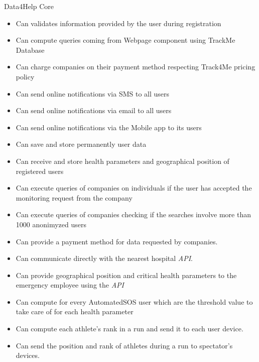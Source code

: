 \noindent Data4Help Core
\begin{itemize}
\item Can validates information provided by the user during registration
\item Can compute queries coming from Webpage component using TrackMe Database
\item Can charge companies on their payment method respecting Track4Me pricing policy

\item Can send online notifications via SMS to all users 
\item Can send online notifications via email to all users
\item Can send online notifications via the Mobile app to its users
\item Can save and store permanently user data
\item Can receive and store health parameters and geographical position of registered users
\item Can execute queries of companies on individuals if the user has accepted the monitoring request from the company
\item Can execute queries of companies checking if the searches involve more than 1000 anonimyzed users 
\item Can provide a payment method for data requested by companies.

\item Can communicate directly with the nearest hospital \textit{API}.
\item Can provide geographical position and critical health parameters to the emergency employee using the \textit{API}
\item Can compute for every AutomatedSOS user which are the threshold value to take care of for each health parameter

\item Can compute each athlete's rank in a run and send it to each user device.
\item Can send the position and rank of athletes during a run to spectator's devices.



\end{itemize}
